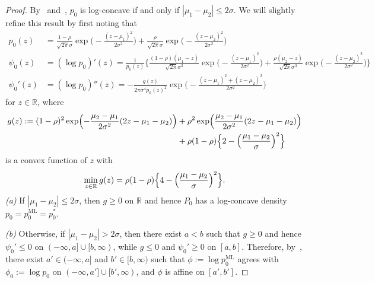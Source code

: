 \documentclass[a4paper]{article}
\newcommand{\R}{\mathbb{R}}
\theoremstyle{definition}
\begin{document}
\begin{proof}
By~\citet{cule2010maximum} and~\citet[Exercise~9.11]{samworth24modern}, $p_0$ is log-concave if and only if $|\mu_1 - \mu_2| \leq 2\sigma$. We will slightly refine this result by first noting that
\begin{align*}
p_0(z) &= \frac{1 - \rho}{\sqrt{2\pi}\sigma}\exp\biggl(-\frac{(z - \mu_1)^2}{2\sigma^2}\biggr) + \frac{\rho}{\sqrt{2\pi}\sigma}\exp\biggl(-\frac{(z - \mu_2)^2}{2\sigma^2}\biggr) \\
\psi_0(z) &= (\log p_0)'(z) = \frac{1}{p_0(z)}\biggl\{\frac{(1 - \rho)(\mu_1 - z)}{\sqrt{2\pi}\sigma^3}\exp\biggl(-\frac{(z - \mu_1)^2}{2\sigma^2}\biggr) + \frac{\rho(\mu_2 - z)}{\sqrt{2\pi}\sigma^3}\exp\biggl(-\frac{(z - \mu_2)^2}{2\sigma^2}\biggr)\biggr\} \\
\psi_0'(z) &= (\log p_0)''(z) = -\frac{g(z)}{2\pi\sigma^4 p_0(z)^2}\exp\biggl(-\frac{(z -\mu_1)^2 + (z - \mu_2)^2}{2\sigma^2}\biggr) 
\end{align*}
for $z \in \R$, where
\begin{align*}
g(z) := (1 - \rho)^2 \exp\Bigl(-\frac{\mu_2 -\mu_1}{2\sigma^2}(2z - \mu_1 - \mu_2)\Bigr) &+ \rho^2 \exp\Bigl(\frac{\mu_2 -\mu_1}{2\sigma^2}(2z - \mu_1 - \mu_2)\Bigr) \\
&+ \rho(1 - \rho)\Bigl\{2 - \Bigl(\frac{\mu_1 - \mu_2}{\sigma}\Bigr)^2\Bigr\}
\end{align*}
is a convex function of $z$ with
\[
\min_{z \in \R}g(z) = \rho(1 - \rho)\Bigl\{4 - \Bigl(\frac{\mu_1 - \mu_2}{\sigma}\Bigr)^2\Bigr\}.
\]
\textit{(a)} If $|\mu_1 - \mu_2| \leq 2\sigma$, then $g \geq 0$ on $\R$ and hence $P_0$ has a log-concave density $p_0 = p_0^{\mathrm{ML}} = p_0^*$.

\medskip
\noindent
\textit{(b)} Otherwise, if $|\mu_1 - \mu_2| > 2\sigma$, then there exist $a < b$ such that $g \geq 0$ and hence $\psi_0' \leq 0$ on $(-\infty,a] \cup [b,\infty)$, while $g \leq 0$ and $\psi_0' \geq 0$ on $[a,b]$. Therefore, by~\citet[Examples~2.11(ii) and~2.12]{dumbgen2011approximation}, there exist $a' \in (-\infty,a]$ and $b' \in [b,\infty)$ such that $\phi := \log p_0^{\mathrm{ML}}$ agrees with $\phi_0 := \log p_0$ on $(-\infty,a'] \cup [b',\infty)$, and $\phi$ is affine on $[a',b']$. 


\end{proof}
\end{document}
